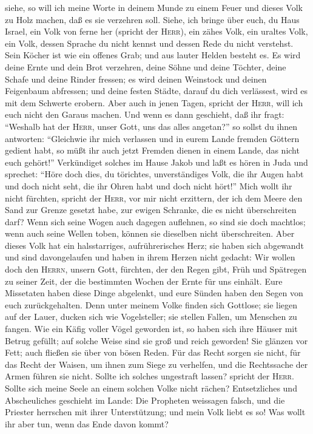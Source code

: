 siehe, so will ich meine Worte in deinem Munde zu einem Feuer und dieses
Volk zu Holz machen, daß es sie verzehren soll.  Siehe,
ich bringe über euch, du Haus Israel, ein Volk von ferne her (spricht
der \textsc{Herr}), ein zähes Volk, ein uraltes Volk, ein Volk, dessen
Sprache du nicht kennst und dessen Rede du nicht verstehst.
 Sein Köcher ist wie ein offenes Grab; und aus lauter
Helden besteht es.  Es wird deine Ernte und dein Brot
verzehren, deine Söhne und deine Töchter, deine Schafe und deine Rinder
fressen; es wird deinen Weinstock und deinen Feigenbaum abfressen; und
deine festen Städte, darauf du dich verlässest, wird es mit dem Schwerte
erobern.  Aber auch in jenen Tagen, spricht der
\textsc{Herr}, will ich euch nicht den Garaus machen. 
Und wenn es dann geschieht, daß ihr fragt: ``Weshalb hat der
\textsc{Herr}, unser Gott, uns das alles angetan?'' so sollst du ihnen
antworten: ``Gleichwie ihr mich verlassen und in eurem Lande fremden
Göttern gedient habt, so müßt ihr auch jetzt Fremden dienen in einem
Lande, das nicht euch gehört!''  Verkündiget solches im
Hause Jakob und laßt es hören in Juda und sprechet: 
``Höre doch dies, du törichtes, unverständiges Volk, die ihr Augen habt
und doch nicht seht, die ihr Ohren habt und doch nicht hört!''
 Mich wollt ihr nicht fürchten, spricht der
\textsc{Herr}, vor mir nicht erzittern, der ich dem Meere den Sand zur
Grenze gesetzt habe, zur ewigen Schranke, die es nicht überschreiten
darf? Wenn sich seine Wogen auch dagegen auflehnen, so sind sie doch
machtlos; wenn auch seine Wellen toben, können sie dieselben nicht
überschreiten.  Aber dieses Volk hat ein halsstarriges,
aufrührerisches Herz; sie haben sich abgewandt und sind davongelaufen
 und haben in ihrem Herzen nicht gedacht: Wir wollen doch
den \textsc{Herrn}, unsern Gott, fürchten, der den Regen gibt, Früh und
Spätregen zu seiner Zeit, der die bestimmten Wochen der Ernte für uns
einhält.  Eure Missetaten haben diese Dinge abgelenkt,
und eure Sünden haben den Segen von euch zurückgehalten. 
Denn unter meinem Volke finden sich Gottlose; sie liegen auf der Lauer,
ducken sich wie Vogelsteller; sie stellen Fallen, um Menschen zu fangen.
 Wie ein Käfig voller Vögel geworden ist, so haben sich
ihre Häuser mit Betrug gefüllt; auf solche Weise sind sie groß und reich
geworden!  Sie glänzen vor Fett; auch fließen sie über
von bösen Reden. Für das Recht sorgen sie nicht, für das Recht der
Waisen, um ihnen zum Siege zu verhelfen, und die Rechtssache der Armen
führen sie nicht.  Sollte ich solches ungestraft lassen?
spricht der \textsc{Herr}. Sollte sich meine Seele an einem solchen
Volke nicht rächen?  Entsetzliches und Abscheuliches
geschieht im Lande:  Die Propheten weissagen falsch, und
die Priester herrschen mit ihrer Unterstützung; und mein Volk liebt es
so! Was wollt ihr aber tun, wenn das Ende davon kommt?

